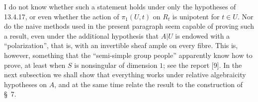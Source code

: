 I do not know whether such a statement holds under only the hypotheses
of 13.4.17, or even whether the action of $\pi_1(U,t)$ on $R_t$ is
unipotent for $t\in U$.  Nor do the naive methods used in the present
paragraph seem capable of proving such a result, even under the
additional hypothesis that $A|U$ is endowed with a ``polarization'',
that is, with an invertible sheaf ample on every fibre.  This is,
however, something that the ``semi-simple group people'' apparently know
how to prove, at least when $S$ is nonsingular of dimension $1$; see the
report [9].  In the next subsection we shall show that everything works
under relative algebraicity hypotheses on $A$, and at the same time
relate the result to the construction of \S~7.
